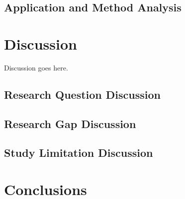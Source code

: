 \documentclass[parskip=full]{scrartcl}
\begin{document}
\subsection{Application and Method Analysis}

\section{Discussion}

Discussion goes here.

\subsection{Research Question Discussion}

\subsection{Research Gap Discussion}

\subsection{Study Limitation Discussion}

\section{Conclusions}


% 

\end{document}
